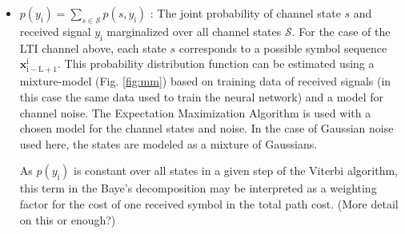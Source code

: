 \documentclass[12pt,a4paper]{article}
\begin{document}
\begin{itemize}
\item $p(y_{\mathrm{i}}) = \sum_{s \in \textit{$\mathcal{S}$}}p(s,y_{\mathrm{i}})$
: The joint probability of channel state $s$ and received signal $y_{\mathrm{i}}$ marginalized over all channel states $\mathcal{S}$. For the case of the LTI channel above, each state $s$ corresponds to a possible symbol sequence $\mathbf{x}_{\mathrm{i-L+1}}^{\mathrm{i}}$. This probability distribution function can be estimated using a mixture-model (Fig. \ref{fig:mm}) based on training data of received signals (in this case the same data used to train the neural network) and a model for channel noise. The Expectation Maximization Algorithm \cite{ng2000cs229} is used with a chosen model for the channel states and noise. 
In the case of Gaussian noise used here, the states are modeled as a mixture of Gaussians.
%
%
\par As $p(y_{\mathrm{i}})$ is constant over all states in a given step of the Viterbi algorithm, this term in the Baye's decomposition may be interpreted as a weighting factor for the cost of one received symbol in the total path cost. (More detail on this or enough?)



\end{itemize}
\end{document}
